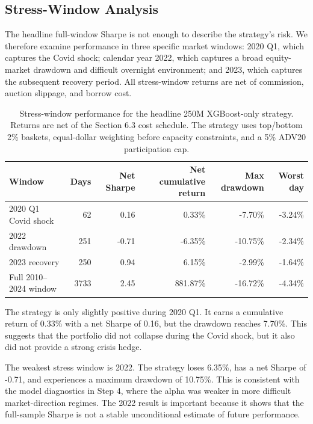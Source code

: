 \documentclass[12pt]{article}
\begin{document}
\subsection{Stress-Window Analysis}

The headline full-window Sharpe is not enough to describe the strategy's risk. We therefore examine performance in three specific market windows: 2020 Q1, which captures the Covid shock; calendar year 2022, which captures a broad equity-market drawdown and difficult overnight environment; and 2023, which captures the subsequent recovery period. All stress-window returns are net of commission, auction slippage, and borrow cost.

\begin{table}[htbp]
\centering
\small
\setlength{\tabcolsep}{4pt}
\begin{tabular}{lrrrrr}
\hline
Window & Days & Net Sharpe & Net cumulative return & Max drawdown & Worst day \\
\hline
2020 Q1 Covid shock & 62 & 0.16 & 0.33\% & -7.70\% & -3.24\% \\
2022 drawdown & 251 & -0.71 & -6.35\% & -10.75\% & -2.34\% \\
2023 recovery & 250 & 0.94 & 6.15\% & -2.99\% & -1.64\% \\
Full 2010--2024 window & 3733 & 2.45 & 881.87\% & -16.72\% & -4.34\% \\
\hline
\end{tabular}
\caption{Stress-window performance for the headline 250M XGBoost-only strategy. Returns are net of the Section 6.3 cost schedule. The strategy uses top/bottom 2\% baskets, equal-dollar weighting before capacity constraints, and a 5\% ADV20 participation cap.}
\label{tab:stage5_stress_windows}
\end{table}

The strategy is only slightly positive during 2020 Q1. It earns a cumulative return of 0.33\% with a net Sharpe of 0.16, but the drawdown reaches 7.70\%. This suggests that the portfolio did not collapse during the Covid shock, but it also did not provide a strong crisis hedge.

The weakest stress window is 2022. The strategy loses 6.35\%, has a net Sharpe of -0.71, and experiences a maximum drawdown of 10.75\%. This is consistent with the model diagnostics in Step 4, where the alpha was weaker in more difficult market-direction regimes. The 2022 result is important because it shows that the full-sample Sharpe is not a stable unconditional estimate of future performance.
\end{document}
